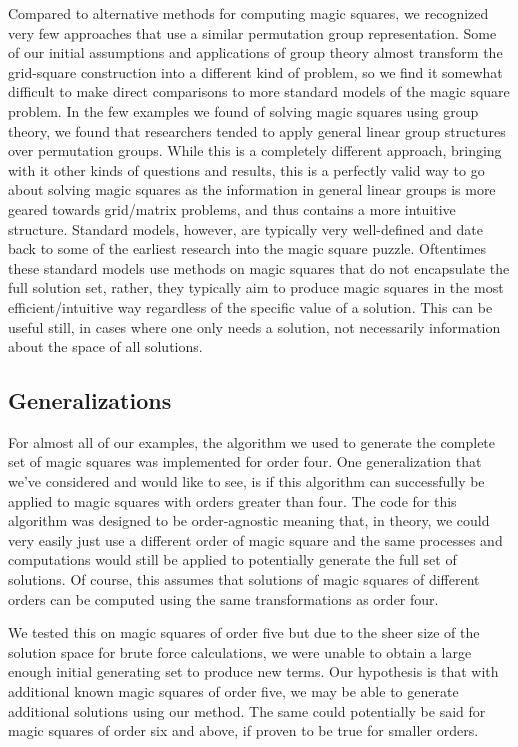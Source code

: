 \documentclass{rhumj_new}
\begin{document}
Compared to alternative methods for computing magic squares, we recognized very few approaches that
use a similar permutation group representation. Some of our initial assumptions and applications of
group theory almost transform the grid-square construction into a different kind of problem, so we
find it somewhat difficult to make direct comparisons to more standard models of the magic square
problem. In the few examples we found of solving magic squares using group theory, we found that
researchers tended to apply general linear group structures over permutation groups. While this is
a completely different approach, bringing with it other kinds of questions and results, this is a
perfectly valid way to go about solving magic squares as the information in general linear groups
is more geared towards grid/matrix problems, and thus contains a more intuitive structure. Standard
models, however, are typically very well-defined and date back to some of the earliest research
into the magic square puzzle. Oftentimes these standard models use methods on magic squares that do
not encapsulate the full solution set, rather, they typically aim to produce magic squares in the
most efficient/intuitive way regardless of the specific value of a solution. This can be useful
still, in cases where one only needs a solution, not necessarily information about the space of all
solutions.

\subsection{Generalizations}

For almost all of our examples, the algorithm we used to generate the complete set of magic squares
was implemented for order four. One generalization that we've considered and would like to see, is
if this algorithm can successfully be applied to magic squares with orders greater than four. The
code for this algorithm was designed to be order-agnostic meaning that, in theory, we could very
easily just use a different order of magic square and the same processes and computations would
still be applied to potentially generate the full set of solutions. Of course, this assumes that
solutions of magic squares of different orders can be computed using the same transformations as
order four.

We tested this on magic squares of order five but due to the sheer size of the solution space for
brute force calculations, we were unable to obtain a large enough initial generating set to produce
new terms. Our hypothesis is that with additional known magic squares of order five, we may be able
to generate additional solutions using our method. The same could potentially be said for magic
squares of order six and above, if proven to be true for smaller orders.
\end{document}
